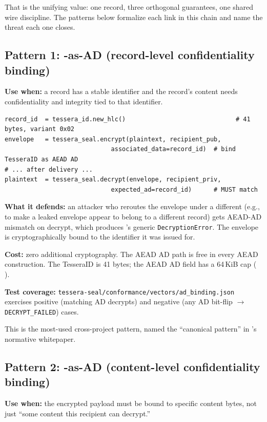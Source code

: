 That is the unifying value: one record, three orthogonal guarantees, one shared wire discipline. The patterns below formalize each link in this chain and name the threat each one closes.

\subsection{Pattern 1: \tesseraid{}-as-AD (record-level confidentiality binding)}

\textbf{Use when:} a record has a stable \tesseraid{} identifier and the record's content needs confidentiality and integrity tied to that identifier.

\begin{lstlisting}[language=Pseudocode]
record_id  = tessera_id.new_hlc()                              # 41 bytes, variant 0x02
envelope   = tessera_seal.encrypt(plaintext, recipient_pub,
                             associated_data=record_id)  # bind TesseraID as AEAD AD
# ... after delivery ...
plaintext  = tessera_seal.decrypt(envelope, recipient_priv,
                             expected_ad=record_id)      # MUST match
\end{lstlisting}

\textbf{What it defends:} an attacker who reroutes the envelope under a different \tesseraid{} (e.g., to make a leaked envelope appear to belong to a different record) gets AEAD-AD mismatch on decrypt, which produces \tesseraseal{}'s generic \texttt{DecryptionError}. The envelope is cryptographically bound to the identifier it was issued for.

\textbf{Cost:} zero additional cryptography. The AEAD AD path is free in every AEAD construction. The TesseraID is 41 bytes; the AEAD AD field has a 64\,KiB cap (\tesseraseal{} ).

\textbf{Test coverage:} \texttt{tessera-seal/conformance/vectors/ad\_binding.json} exercises positive (matching AD decrypts) and negative (any AD bit-flip $\to$ \texttt{DECRYPT\_FAILED}) cases.

This is the most-used cross-project pattern, named the ``canonical pattern'' in \tesseraseal{}'s normative whitepaper.

\subsection{Pattern 2: \tesserahash{}-as-AD (content-level confidentiality binding)}

\textbf{Use when:} the encrypted payload must be bound to specific content bytes, not just ``some content this recipient can decrypt.''


